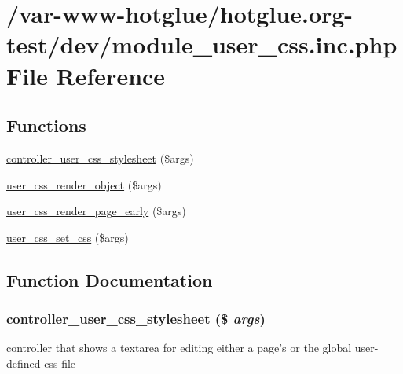 \hypertarget{module__user__css_8inc_8php}{
\section{/var-\/www-\/hotglue/hotglue.org-\/test/dev/module\_\-user\_\-css.inc.php File Reference}
\label{module__user__css_8inc_8php}
}
\subsection*{Functions}
\begin{DoxyCompactItemize}
\item 
\hyperlink{module__user__css_8inc_8php_a572226d9a006e84533980340eddbcdea}{controller\_\-user\_\-css\_\-stylesheet} (\$args)
\item 
\hyperlink{module__user__css_8inc_8php_ab26eaefed01451501b96acf67fbd9401}{user\_\-css\_\-render\_\-object} (\$args)
\item 
\hyperlink{module__user__css_8inc_8php_af0bd5e1927965e4cd775bfb30d510ac1}{user\_\-css\_\-render\_\-page\_\-early} (\$args)
\item 
\hyperlink{module__user__css_8inc_8php_a568a25309a9a2419076775fd77dbdfda}{user\_\-css\_\-set\_\-css} (\$args)
\end{DoxyCompactItemize}


\subsection{Function Documentation}
\hypertarget{module__user__css_8inc_8php_a572226d9a006e84533980340eddbcdea}{
\subsubsection[{controller\_\-user\_\-css\_\-stylesheet}]{\setlength{\rightskip}{0pt plus 5cm}controller\_\-user\_\-css\_\-stylesheet (\$ {\em args})}}
\label{module__user__css_8inc_8php_a572226d9a006e84533980340eddbcdea}
controller that shows a textarea for editing either a page's or the global user-\/defined css file 

